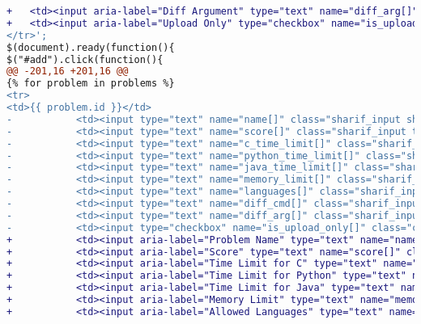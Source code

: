 \begin{itemize}
\begin{lstlisting}[language=diff, caption=Perubahan untuk mematuhi kriteria 1.3.1, label=lst_1.3.1, basicstyle=\ttfamily, frame=single,
columns=fullflexible, keepspaces=true, breaklines=true]
+ 	<td><input aria-label="Diff Argument" type="text" name="diff_arg[]" class="sharif_input tiny" value="-bB"/></td>\
+ 	<td><input aria-label="Upload Only" type="checkbox" name="is_upload_only[]" class="check" value="PID"/><td><i class="fa fa-times-circle fa-lg color1 delete_problem pointer"></i></td></td>\
</tr>';
$(document).ready(function(){
$("#add").click(function(){
@@ -201,16 +201,16 @@
{% for problem in problems %}
<tr>
<td>{{ problem.id }}</td>
- 			<td><input type="text" name="name[]" class="sharif_input short" value="{{ problem.name }}"/></td>
- 			<td><input type="text" name="score[]" class="sharif_input tiny2" value="{{ problem.score }}"/></td>
- 			<td><input type="text" name="c_time_limit[]" class="sharif_input tiny2" value="{{ problem.c_time_limit }}"/></td>
- 			<td><input type="text" name="python_time_limit[]" class="sharif_input tiny2" value="{{ problem.python_time_limit }}"/></td>
- 			<td><input type="text" name="java_time_limit[]" class="sharif_input tiny2" value="{{ problem.java_time_limit }}"/></td>
- 			<td><input type="text" name="memory_limit[]" class="sharif_input tiny" value="{{ problem.memory_limit }}"/></td>
- 			<td><input type="text" name="languages[]" class="sharif_input short2" value="{{ problem.allowed_languages }}"/></td>
- 			<td><input type="text" name="diff_cmd[]" class="sharif_input tiny" value="{{ problem.diff_cmd }}"/></td>
- 			<td><input type="text" name="diff_arg[]" class="sharif_input tiny" value="{{ problem.diff_arg }}"/></td>
- 			<td><input type="checkbox" name="is_upload_only[]" class="check" value="{{ problem.id }}" {{ problem.is_upload_only ? 'checked' }}/></td>
+ 			<td><input aria-label="Problem Name" type="text" name="name[]" class="sharif_input short" value="{{ problem.name }}"/></td>
+ 			<td><input aria-label="Score" type="text" name="score[]" class="sharif_input tiny2" value="{{ problem.score }}"/></td>
+ 			<td><input aria-label="Time Limit for C" type="text" name="c_time_limit[]" class="sharif_input tiny2" value="{{ problem.c_time_limit }}"/></td>
+ 			<td><input aria-label="Time Limit for Python" type="text" name="python_time_limit[]" class="sharif_input tiny2" value="{{ problem.python_time_limit }}"/></td>
+ 			<td><input aria-label="Time Limit for Java" type="text" name="java_time_limit[]" class="sharif_input tiny2" value="{{ problem.java_time_limit }}"/></td>
+ 			<td><input aria-label="Memory Limit" type="text" name="memory_limit[]" class="sharif_input tiny" value="{{ problem.memory_limit }}"/></td>
+ 			<td><input aria-label="Allowed Languages" type="text" name="languages[]" class="sharif_input short2" value="{{ problem.allowed_languages }}"/></td>

\end{lstlisting}
\end{itemize}
